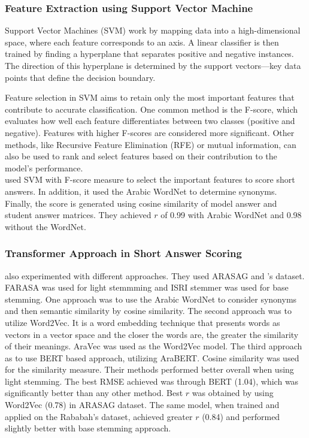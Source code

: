 \documentclass{article}
\begin{document}
	\subsubsection*{Feature Extraction using Support Vector Machine}
	Support Vector Machines (SVM) work by mapping data into a high-dimensional space, where each feature corresponds to an axis. A linear classifier is then trained by finding a hyperplane that separates positive and negative instances. The direction of this hyperplane is determined by the support vectors—key data points that define the decision boundary.
	
	Feature selection in SVM aims to retain only the most important features that contribute to accurate classification. One common method is the F-score, which evaluates how well each feature differentiates between two classes (positive and negative). Features with higher F-scores are considered more significant. Other methods, like Recursive Feature Elimination (RFE) or mutual information, can also be used to rank and select features based on their contribution to the model's performance. \\ 
	
	\textbf{\textcite{4_abdeljaber2021wordnet}} used SVM with F-score measure to select the important features to score short answers. In addition, it used the Arabic WordNet to determine synonyms. Finally, the score is generated using cosine similarity of model answer and student answer matrices. They achieved $r$ of 0.99 with Arabic WordNet and 0.98 without the WordNet.
	
	\subsubsection*{Transformer Approach in Short Answer Scoring}
	\textbf{\textcite{22_meccawy2023mining}} also experimented with different approaches. They used ARASAG and \textcite{16_rababah2017short}'s dataset. FARASA was used for light stemmming and ISRI stemmer was used for base stemming. One approach was to use the Arabic WordNet to consider synonyms and then semantic similarity by cosine similarity. The second approach was to utilize Word2Vec. It is a word embedding technique that presents words as vectors in a vector space and the closer the words are, the greater the similarity of their meanings. AraVec was used as the Word2Vec model. The third approach as to use BERT based approach, utilizing AraBERT. Cosine similarity was used for the similarity measure. Their methods performed better overall when using light stemming. The best RMSE achieved was through BERT (1.04), which was significantly better than any other method. Best $r$ was obtained by using Word2Vec (0.78) in ARASAG dataset. The same model, when trained and applied on the Rababah's dataset, achieved greater $r$ (0.84) and performed slightly better with base stemming approach. \\
	
\end{document}
